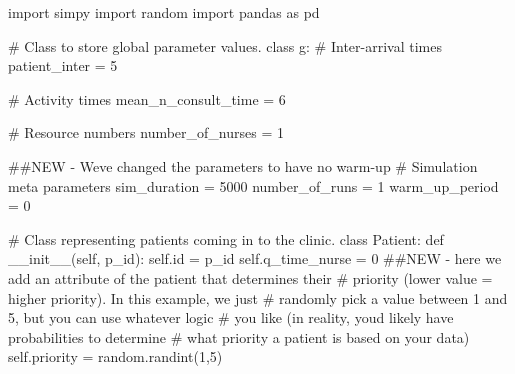 \documentclass[
  letterpaper,
  DIV=11,
  numbers=noendperiod]{scrreprt}
\newenvironment{Shaded}{}{}
\newcommand{\BuiltInTok}[1]{\textcolor[rgb]{0.84,0.23,0.29}{#1}}
\newcommand{\CommentTok}[1]{\textcolor[rgb]{0.42,0.45,0.49}{#1}}
\newcommand{\DecValTok}[1]{\textcolor[rgb]{0.00,0.36,0.77}{#1}}
\newcommand{\FunctionTok}[1]{\textcolor[rgb]{0.44,0.26,0.76}{#1}}
\newcommand{\ImportTok}[1]{\textcolor[rgb]{0.01,0.18,0.38}{#1}}
\newcommand{\KeywordTok}[1]{\textcolor[rgb]{0.84,0.23,0.29}{#1}}
\newcommand{\NormalTok}[1]{\textcolor[rgb]{0.14,0.16,0.18}{#1}}
\newcommand{\OperatorTok}[1]{\textcolor[rgb]{0.14,0.16,0.18}{#1}}
\newcommand{\VariableTok}[1]{\textcolor[rgb]{0.89,0.38,0.04}{#1}}
\begin{document}
\begin{tcolorbox}[enhanced jigsaw, colframe=quarto-callout-note-color-frame, bottomtitle=1mm, breakable, rightrule=.15mm, coltitle=black, colbacktitle=quarto-callout-note-color!10!white, opacityback=0, leftrule=.75mm, arc=.35mm, toptitle=1mm, title=\textcolor{quarto-callout-note-color}{\faInfo}\hspace{0.5em}{Click here to view the full code}, titlerule=0mm, colback=white, toprule=.15mm, bottomrule=.15mm, left=2mm, opacitybacktitle=0.6]

\begin{Shaded}
\begin{Highlighting}[]
\ImportTok{import}\NormalTok{ simpy}
\ImportTok{import}\NormalTok{ random}
\ImportTok{import}\NormalTok{ pandas }\ImportTok{as}\NormalTok{ pd}

\CommentTok{\# Class to store global parameter values.}
\KeywordTok{class}\NormalTok{ g:}
    \CommentTok{\# Inter{-}arrival times}
\NormalTok{    patient\_inter }\OperatorTok{=} \DecValTok{5}

    \CommentTok{\# Activity times}
\NormalTok{    mean\_n\_consult\_time }\OperatorTok{=} \DecValTok{6}

    \CommentTok{\# Resource numbers}
\NormalTok{    number\_of\_nurses }\OperatorTok{=} \DecValTok{1}

    \CommentTok{\#\#NEW {-} We\textquotesingle{}ve changed the parameters to have no warm{-}up}
    \CommentTok{\# Simulation meta parameters}
\NormalTok{    sim\_duration }\OperatorTok{=} \DecValTok{5000}
\NormalTok{    number\_of\_runs }\OperatorTok{=} \DecValTok{1}
\NormalTok{    warm\_up\_period }\OperatorTok{=} \DecValTok{0}

\CommentTok{\# Class representing patients coming in to the clinic.}
\KeywordTok{class}\NormalTok{ Patient:}
    \KeywordTok{def} \FunctionTok{\_\_init\_\_}\NormalTok{(}\VariableTok{self}\NormalTok{, p\_id):}
        \VariableTok{self}\NormalTok{.}\BuiltInTok{id} \OperatorTok{=}\NormalTok{ p\_id}
        \VariableTok{self}\NormalTok{.q\_time\_nurse }\OperatorTok{=} \DecValTok{0}
        \CommentTok{\#\#NEW {-} here we add an attribute of the patient that determines their}
        \CommentTok{\# priority (lower value = higher priority).  In this example, we just}
        \CommentTok{\# randomly pick a value between 1 and 5, but you can use whatever logic}
        \CommentTok{\# you like (in reality, you\textquotesingle{}d likely have probabilities to determine}
        \CommentTok{\# what priority a patient is based on your data)}
        \VariableTok{self}\NormalTok{.priority }\OperatorTok{=}\NormalTok{ random.randint(}\DecValTok{1}\NormalTok{,}\DecValTok{5}\NormalTok{)}


\end{Highlighting}
\end{Shaded}
\end{tcolorbox}
\end{document}
